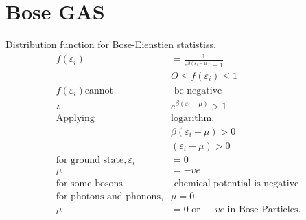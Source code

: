 \section{Bose GAS}
Distribution function for Bose-Eienstien statistiss,
\begin{align*}
f(\varepsilon_i)&=\frac{1}{e^{\beta(\varepsilon_i-\mu)}-1}\\
&O\leq f(\varepsilon_i)\leq1\\
f(\varepsilon_i)\text{cannot}&\text{ be negative}\\
\therefore\quad&e^{\beta(\varepsilon_i-\mu)}>1\\
\text{Applying }&\text{logarithm.}\\
&\beta(\varepsilon_i-\mu)>0\\
&(\varepsilon_i-\mu)>0\\
\text{for ground state},\varepsilon_{i}&=0\\
\mu&=-ve\\
\text{for some bosons}&\text{ chemical potential is negative} \\
\text{for photons and phonons,}&\mu=0\\
\mu&=0\text{ or }-ve\text{ in Bose Particles.}
\end{align*}
